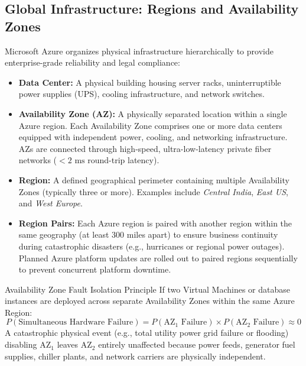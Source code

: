\documentclass[11pt,a4paper,openany]{report}
\begin{document}
\subsection{Global Infrastructure: Regions and Availability Zones}
Microsoft Azure organizes physical infrastructure hierarchically to provide enterprise-grade reliability and legal compliance:
\begin{itemize}[leftmargin=*]
  \item \textbf{Data Center:} A physical building housing server racks, uninterruptible power supplies (UPS), cooling infrastructure, and network switches.
  \item \textbf{Availability Zone (AZ):} A physically separated location within a single Azure region. Each Availability Zone comprises one or more data centers equipped with independent power, cooling, and networking infrastructure. AZs are connected through high-speed, ultra-low-latency private fiber networks ($< 2\text{ ms}$ round-trip latency).
  \item \textbf{Region:} A defined geographical perimeter containing multiple Availability Zones (typically three or more). Examples include \emph{Central India}, \emph{East US}, and \emph{West Europe}.
  \item \textbf{Region Pairs:} Each Azure region is paired with another region within the same geography (at least 300 miles apart) to ensure business continuity during catastrophic disasters (e.g., hurricanes or regional power outages). Planned Azure platform updates are rolled out to paired regions sequentially to prevent concurrent platform downtime.
\end{itemize}

\begin{thmbox}{Availability Zone Fault Isolation Principle}
If two Virtual Machines or database instances are deployed across separate Availability Zones within the same Azure Region:
\begin{equation}
P(\text{Simultaneous Hardware Failure}) = P(\text{AZ}_1\text{ Failure}) \times P(\text{AZ}_2\text{ Failure}) \approx 0
\end{equation}
A catastrophic physical event (e.g., total utility power grid failure or flooding) disabling $\text{AZ}_1$ leaves $\text{AZ}_2$ entirely unaffected because power feeds, generator fuel supplies, chiller plants, and network carriers are physically independent.
\end{thmbox}
\end{document}
